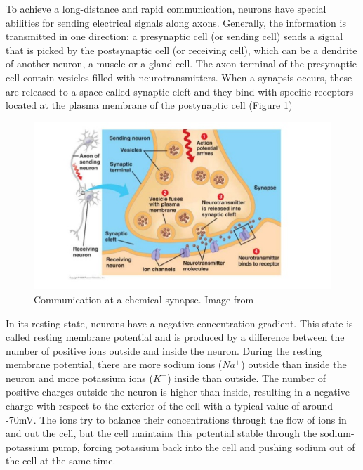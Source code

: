 To achieve a long-distance and rapid communication, neurons have special abilities for sending electrical signals along axons. Generally, the information is transmitted in one direction: a presynaptic cell (or sending cell) sends a signal that is picked by the postsynaptic cell (or receiving cell), which can be a dendrite of another neuron, a muscle or a gland cell. The axon terminal of the presynaptic cell contain vesicles filled with neurotransmitters. When a synapsis occurs, these are released to a space called synaptic cleft and they bind with specific receptors located at the plasma membrane of the postynaptic cell (Figure \ref{fig:synapsis})


\begin{figure}[ht]
\centering
\includegraphics[width=1\textwidth]{Images/synapsis.jpg}
\caption{Communication at a chemical synapse. Image from \citet{Campbell2013}}
\label{fig:synapsis}
\end{figure}

In its resting state, neurons have a negative concentration gradient. This state is called resting membrane potential and is produced by a difference between the number of positive ions outside and inside the neuron. During the resting membrane potential, there are more sodium ions ($Na^+$) outside than inside the neuron and more potassium ions ($K^+$) inside than outside. The number of positive charges outside the neuron is higher than inside, resulting in a negative charge with respect to the exterior of the cell with a typical value of around -70mV. The ions try to balance their concentrations through the flow of ions in and out the cell, but the cell maintains this potential stable through the sodium-potassium pump, forcing potassium back into the cell and pushing sodium out of the cell at the same time. 

